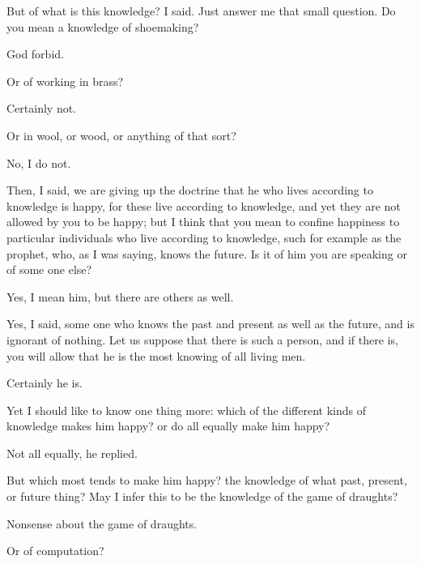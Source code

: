 \documentclass[11pt,letter]{article}
\begin{document}
\par  But of what is this knowledge? I said. Just answer me that small question. Do you mean a knowledge of shoemaking?

\par  God forbid.

\par  Or of working in brass?

\par  Certainly not.

\par  Or in wool, or wood, or anything of that sort?

\par  No, I do not.

\par  Then, I said, we are giving up the doctrine that he who lives according to knowledge is happy, for these live according to knowledge, and yet they are not allowed by you to be happy; but I think that you mean to confine happiness to particular individuals who live according to knowledge, such for example as the prophet, who, as I was saying, knows the future. Is it of him you are speaking or of some one else?

\par  Yes, I mean him, but there are others as well.

\par  Yes, I said, some one who knows the past and present as well as the future, and is ignorant of nothing. Let us suppose that there is such a person, and if there is, you will allow that he is the most knowing of all living men.

\par  Certainly he is.

\par  Yet I should like to know one thing more: which of the different kinds of knowledge makes him happy? or do all equally make him happy?

\par  Not all equally, he replied.

\par  But which most tends to make him happy? the knowledge of what past, present, or future thing? May I infer this to be the knowledge of the game of draughts?

\par  Nonsense about the game of draughts.

\par  Or of computation?
\end{document}
